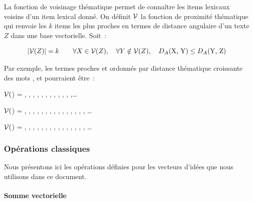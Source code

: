{La fonction de voisinage thématique permet de connaître les items
lexicaux voisins d'un item lexical donné.  On définit ${\cal V}$ la
fonction de proximité thématique qui renvoie les $k$ items les plus
proches en termes de distance angulaire d'un texte $Z$ dans une base
vectorielle. Soit~:


\begin{equation}
  \label{eq:voisinage}
  \left|{\cal V}(Z)\right|= k \qquad
  \forall X \in {\cal V}(Z), \quad  \forall Y \notin {\cal 
    V}(Z), \quad  \mbox{$D_{A}($X, Y$)$} \leq \mbox{$D_{A}($Y, Z$)$}
\end{equation}

Par exemple, les termes proches et ordonnés par distance thématique
 croissante des mots ,
 et  pourraient être~:

$\cal V($) = , ,
, , ,
, ,
, , ,
, ,\ldots
  
$\cal V($) = , ,
, , ,
, , ,
, , ,
, , ,
, \ldots

$\cal V($) = , ,
,  , ,
, , ,
, , ,
, , ,
, \ldots

\subsubsection{Opérations classiques}\label{operateurs}
 Nous présentons ici les opérations
définies pour les vecteurs d'idées que nous
utilisons dans ce document.

\paragraph{Somme vectorielle}\label{sec:somme-vectorielle}

}
